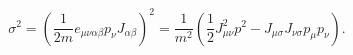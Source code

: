 \begin{equation}
\sigma ^2=\left( \frac 1{2m}e_{\mu \nu \alpha \beta }p_\nu
J_{\alpha \beta }\right) ^2=\frac 1{m^2}\left( \frac{1}{2}J_{\mu
\nu }^2p^2-J_{\mu \sigma }J_{\nu \sigma }p_\mu p_\nu \right) .
\label{71}
\end{equation}

